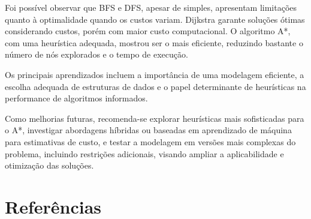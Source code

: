 \documentclass[12pt,a4paper]{article}
\begin{document}
Foi possível observar que BFS e DFS, apesar de simples, apresentam limitações quanto à optimalidade quando os custos variam. Dijkstra garante soluções ótimas considerando custos, porém com maior custo computacional. O algoritmo A*, com uma heurística adequada, mostrou ser o mais eficiente, reduzindo bastante o número de nós explorados e o tempo de execução.  

Os principais aprendizados incluem a importância de uma modelagem eficiente, a escolha adequada de estruturas de dados e o papel determinante de heurísticas na performance de algoritmos informados.  

Como melhorias futuras, recomenda-se explorar heurísticas mais sofisticadas para o A*, investigar abordagens híbridas ou baseadas em aprendizado de máquina para estimativas de custo, e testar a modelagem em versões mais complexas do problema, incluindo restrições adicionais, visando ampliar a aplicabilidade e otimização das soluções.

\section*{Referências}


\end{document}
